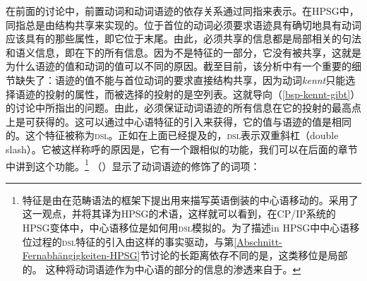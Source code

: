 \noindent
在前面的讨论中，前置动词和动词语迹的依存关系通过同指来表示。在HPSG中，同指总是由结构共享来实现的。位于首位的动词必须要求语迹具有确切地具有动词应该具有的那些属性，即它位于末尾。由此，必须共享的信息都是局部相关的句法和语义信息，即在\local 下的所有信息。因为\phon 不是\local 特征的一部分，它没有被共享，这就是为什么语迹的\phon 值和动词的值可以不同的原因。截至目前，该分析中有一个重要的细节缺失了：语迹的\local 值不能与首位动词的要求直接结构共享，因为动词\emph{kennt}只能选择语迹的投射的属性，而被选择的投射的\subcatl 是空列表。这就导向（\ref{bsp-kennt-gibt}）的讨论中所指出的问题。由此，必须保证动词语迹的所有信息在它的投射的最高点上是可获得的。这可以通过中心语特征的引入来获得，它的值与语迹的\localv 值是相同的。这个特征被称为\textsc{dsl}。正如在上面已经提及的，\textsc{dsl}表示双重斜杠（double slash）。它被这样称呼的原因是，它有一个跟\slashf 相似的功能，我们可以在后面的章节中讲到这个功能。\footnote{
特征\dsl 是由\citet*{Jacobson87}在范畴语法\indexcg 的框架下提出用来描写英语倒装的中心语移动的。\citet{Borsley89}采用了这一观点，并将其译为HPSG的术语，这样就可以看到，在CP/IP系统的HPSG变体中，中心语移位是如何用\textsc{dsl}模拟的。为了描述in HPSG中中心语移位过程的\textsc{dsl}特征的引入由这样的事实驱动，与第\ref{Abschnitt-Fernabhängigkeiten-HPSG}节讨论的长距离依存不同的是，这类移位是局部的。
这种将动词语迹作为中心语的部分的信息的渗透来自于\citet{Oliva92a}。
}
（）显示了动词语迹的修饰了的词项：
